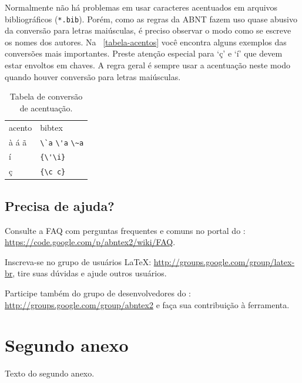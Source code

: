\documentclass[12pt,oneside,a4paper,chapter=TITLE,english,brazil]{abntex2}
\begin{document}
\begin{anexosenv}
Normalmente não há problemas em usar caracteres acentuados em arquivos bibliográficos (\texttt{*.bib}). Porém, como as regras da ABNT fazem uso quase abusivo da conversão para letras maiúsculas, é preciso observar o modo como se escreve os nomes dos autores. Na ~\autoref{tabela-acentos} você encontra alguns exemplos das conversões mais importantes. Preste atenção especial para `ç' e `í' que devem estar envoltos em chaves. A regra geral é sempre usar a acentuação neste modo quando houver conversão para letras maiúsculas.
\begin{table}[htbp]
\caption{Tabela de conversão de acentuação.}
\label{tabela-acentos}
\begin{center}
\begin{tabular}{ll}\hline\hline
acento & \textsf{bibtex}\\
à á ã & \verb+\`a+ \verb+\'a+ \verb+\~a+\\
í & \verb+{\'\i}+\\
ç & \verb+{\c c}+\\
\hline\hline
\end{tabular}
\end{center}
\end{table}


\section{Precisa de ajuda?}

Consulte a FAQ com perguntas frequentes e comuns no portal do \abnTeX: \url{https://code.google.com/p/abntex2/wiki/FAQ}.

Inscreva-se no grupo de usuários \LaTeX: \url{http://groups.google.com/group/latex-br}, tire suas dúvidas e ajude outros usuários.

Participe também do grupo de desenvolvedores do \abnTeX: \url{http://groups.google.com/group/abntex2} e faça sua contribuição à ferramenta.


\chapter{Segundo anexo}

Texto do segundo anexo.

\end{anexosenv}


\printindex
\end{document}
